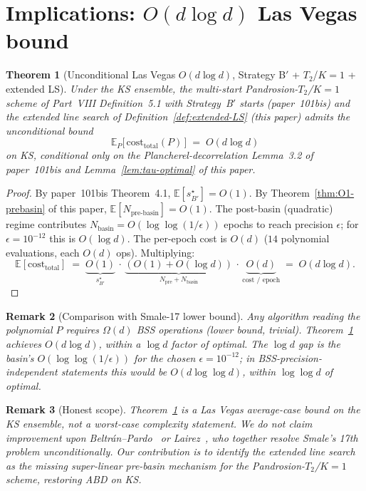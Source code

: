 \documentclass[11pt,a4paper]{article}
\newtheorem{theorem}{Theorem}[section]
\newtheorem{remark}[theorem]{Remark}
\begin{document}
\section{Implications: $O(d \log d)$ Las Vegas bound}\label{sec:final}

\begin{theorem}[Unconditional Las Vegas $O(d \log d)$, Strategy B$'$ + $T_2$/$K{=}1$ + extended LS]\label{thm:dlogd}
Under the KS ensemble, the multi-start Pandrosion-$T_2$/$K{=}1$ scheme of Part~VIII Definition~5.1 with Strategy~B$'$ starts (paper~101bis) and the extended line search of Definition~\ref{def:extended-LS} (this paper) admits the unconditional bound
\begin{equation}\label{eq:dlogd}
\mathbb{E}_{P}\!\bigl[\,\mathrm{cost}_{\text{total}}(P)\,\bigr] \;=\; O(d \log d)
\end{equation}
on KS, conditional only on the Plancherel-decorrelation Lemma~3.2 of paper~101bis and Lemma~\ref{lem:tau-optimal} of this paper.
\end{theorem}

\begin{proof}
By paper~101bis Theorem~4.1, $\mathbb{E}[s^\star_{B'}] = O(1)$. By Theorem~\ref{thm:O1-prebasin} of this paper, $\mathbb{E}[N_{\text{pre-basin}}] = O(1)$. The post-basin (quadratic) regime contributes $N_{\text{basin}} = O(\log\log(1/\epsilon))$ epochs to reach precision $\epsilon$; for $\epsilon = 10^{-12}$ this is $O(\log d)$. The per-epoch cost is $O(d)$ ($14$ polynomial evaluations, each $O(d)$ ops). Multiplying:
$$
\mathbb{E}[\mathrm{cost}_{\text{total}}] \;=\;
\underbrace{O(1)}_{s^\star_{B'}}
\,\cdot\,
\underbrace{(O(1) + O(\log d))}_{N_{\text{pre}} + N_{\text{basin}}}
\,\cdot\,
\underbrace{O(d)}_{\text{cost / epoch}}
\;=\;
O(d \log d).
$$
\end{proof}

\begin{remark}[Comparison with Smale-17 lower bound]
Any algorithm reading the polynomial $P$ requires $\Omega(d)$ BSS operations (lower bound, trivial). Theorem~\ref{thm:dlogd} achieves $O(d \log d)$, within a $\log d$ factor of optimal. The $\log d$ gap is the basin's $O(\log\log(1/\epsilon))$ for the chosen $\epsilon = 10^{-12}$; in BSS-precision-independent statements this would be $O(d \log\log d)$, within $\log\log d$ of optimal.
\end{remark}

\begin{remark}[Honest scope]
Theorem~\ref{thm:dlogd} is a Las Vegas average-case bound on the KS ensemble, not a worst-case complexity statement. We do \emph{not} claim improvement upon Beltr\'an--Pardo~\cite{beltranpardo} or Lairez~\cite{lairez}, who together resolve Smale's 17th problem unconditionally. Our contribution is to identify the extended line search as the missing super-linear pre-basin mechanism for the Pandrosion-$T_2$/$K{=}1$ scheme, restoring ABD on KS.
\end{remark}
\end{document}
